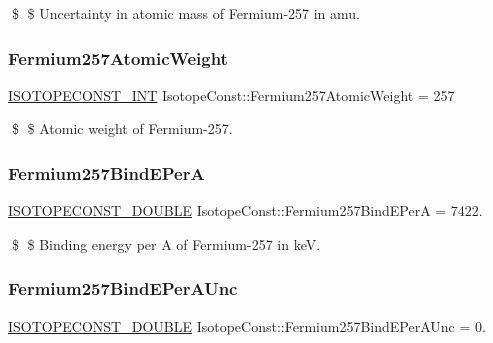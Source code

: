 \$ \$ Uncertainty in atomic mass of Fermium-\/257 in amu. \mbox{\label{group___isotope_const-_fermium-_fm257_ga5cff1646a7390fb647a891ea3a493b2c}} 
\subsubsection{\texorpdfstring{Fermium257\+Atomic\+Weight}{Fermium257AtomicWeight}}
{\footnotesize\ttfamily \mbox{\hyperlink{group___isotope_const-_macros_ga5f18360b3e99483a35c32d789e62621c}{I\+S\+O\+T\+O\+P\+E\+C\+O\+N\+S\+T\+\_\+\+I\+NT}} Isotope\+Const\+::\+Fermium257\+Atomic\+Weight = 257}

\$ \$ Atomic weight of Fermium-\/257. \mbox{\label{group___isotope_const-_fermium-_fm257_ga3ccab5f8a7af9fdc61bbd6758daf1fa3}} 
\subsubsection{\texorpdfstring{Fermium257\+Bind\+E\+PerA}{Fermium257BindEPerA}}
{\footnotesize\ttfamily \mbox{\hyperlink{group___isotope_const-_macros_ga8f45a7272ce02c0b4c65c44636ed719a}{I\+S\+O\+T\+O\+P\+E\+C\+O\+N\+S\+T\+\_\+\+D\+O\+U\+B\+LE}} Isotope\+Const\+::\+Fermium257\+Bind\+E\+PerA = 7422.}

\$ \$ Binding energy per A of Fermium-\/257 in keV. \mbox{\label{group___isotope_const-_fermium-_fm257_ga2f8eb9a6a82b390fa66f6dadd0073fbc}} 
\subsubsection{\texorpdfstring{Fermium257\+Bind\+E\+Per\+A\+Unc}{Fermium257BindEPerAUnc}}
{\footnotesize\ttfamily \mbox{\hyperlink{group___isotope_const-_macros_ga8f45a7272ce02c0b4c65c44636ed719a}{I\+S\+O\+T\+O\+P\+E\+C\+O\+N\+S\+T\+\_\+\+D\+O\+U\+B\+LE}} Isotope\+Const\+::\+Fermium257\+Bind\+E\+Per\+A\+Unc = 0.}

